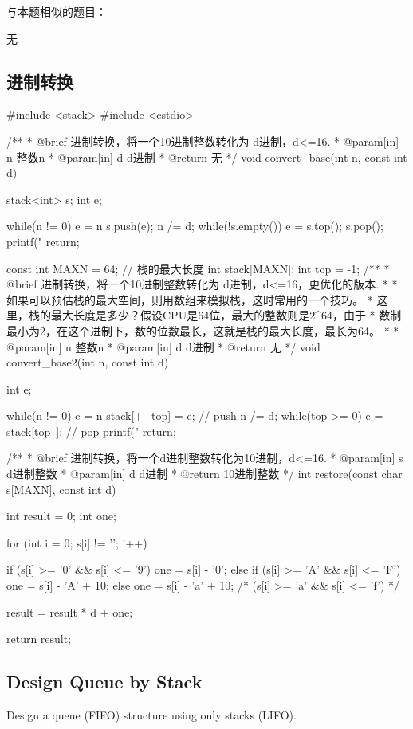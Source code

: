 与本题相似的题目：
\begindot
\item  无
\myenddot


\subsection{进制转换}
\begin{Codex}[label=convert_base.cpp]
#include <stack>
#include <cstdio>

 /**
  * @brief 进制转换，将一个10进制整数转化为 d进制，d<=16.
  * @param[in] n 整数n
  * @param[in] d d进制
  * @return 无
  */
void convert_base(int n, const int d) {
    stack<int> s;
    int e;

    while(n != 0) {
        e = n %
        s.push(e);
        n /= d;
    }
    while(!s.empty()) {
        e = s.top();
        s.pop();
        printf("%
    }
    return;
}

const int MAXN = 64; // 栈的最大长度
int stack[MAXN];
int top = -1;
/**
 * @brief 进制转换，将一个10进制整数转化为 d进制，d<=16，更优化的版本.
 *
 * 如果可以预估栈的最大空间，则用数组来模拟栈，这时常用的一个技巧。
 * 这里，栈的最大长度是多少？假设CPU是64位，最大的整数则是2^64，由于
 * 数制最小为2，在这个进制下，数的位数最长，这就是栈的最大长度，最长为64。
 *
 * @param[in] n 整数n
 * @param[in] d d进制
 * @return 无
 */
void convert_base2(int n, const int d) {
    int e;

    while(n != 0) {
        e = n %
        stack[++top] = e; // push
        n /= d;
    }
    while(top >= 0) {
        e = stack[top--]; // pop
        printf("%
    }
    return;
}


/**
 * @brief 进制转换，将一个d进制整数转化为10进制，d<=16.
 * @param[in] s d进制整数
 * @param[in] d d进制
 * @return 10进制整数
 */
int restore(const char s[MAXN], const int d) {
    int result = 0;
    int one;

    for (int i = 0; s[i] != '\0'; i++) {
        if (s[i] >= '0' && s[i] <= '9') one = s[i] - '0';
        else if (s[i] >= 'A' && s[i] <= 'F') one = s[i] - 'A' + 10;
        else one = s[i] - 'a' + 10; /* (s[i] >= 'a' && s[i] <= 'f') */
        
        result = result * d + one;
    }
    return result;
}
\end{Codex}


\subsection{Design Queue by Stack}
Design a queue (FIFO) structure using only stacks (LIFO). 


